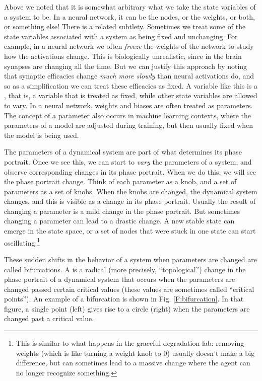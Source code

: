 Above we noted that it is somewhat arbitrary what we take the state variables of a system to be. In a neural network, it can be the nodes, or the weights, or both, or something else! There is a related subtlety. Sometimes we treat some of the state variables associated with a system as being fixed and unchanging. For example, in a neural network we often \emph{freeze} the weights of the network to study how the activations change. This is biologically unrealistic, since in the brain synapses are changing all the time. But we can justify this approach by noting that synaptic efficacies change \emph{much more slowly} than neural activations do, and so as a simplification we can treat these efficacies as fixed. A variable like this is a , that is, a variable that is treated as fixed, while other state variables are allowed to vary. In a neural network, weights and biases are often treated as parameters. The concept of a parameter also occurs in machine learning contexts, where the parameters of a model are adjusted during training, but then usually fixed when the model is being used.

The parameters of a dynamical system are part of what determines its phase portrait. Once we see this, we can start to \emph{vary} the parameters of a system, and observe corresponding changes in its phase portrait. When we do this, we will see the phase portrait change. Think of each parameter as a knob, and a set of parameters as a set of knobs. When the knobs are changed, the dynamical system changes, and this is visible as a change in its phase portrait. Usually the result of changing a parameter is a mild change in the phase portrait. But sometimes changing a parameter can lead to a drastic change. A new stable state can emerge in the state space, or a set of nodes that were stuck in one state can start oscillating.\footnote{This is similar to what happens in the graceful degradation lab: removing weights (which is like turning a weight knob to 0) usually doesn't make a big difference, but can sometimes lead to a massive change where the agent can no longer recognize something.} 

These sudden shifts in the behavior of a system when parameters are changed are called bifurcations. A  is a radical (more precisely, ``topological'') change in the phase portrait of a dynamical system that occurs when the parameters are changed passed certain critical values (these values are sometimes called ``critical points''). An example of a bifurcation is shown in Fig. \ref{F:bifurcation}. In that figure, a single point (left) gives rise to a circle (right) when the parameters are changed past a critical value.

